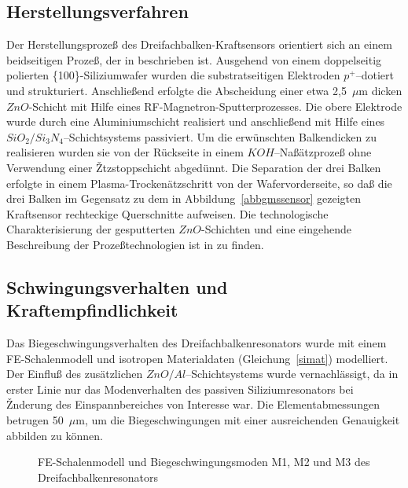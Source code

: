 \subsection{Herstellungsverfahren}
\label{Herstellungsverfahren}

Der Herstellungsprozeß des Dreifachbalken-Kraftsensors orientiert sich an
einem beidseitigen Prozeß, der in \cite{Mul91} beschrieben ist.
Ausgehend von einem doppelseitig polierten \{100\}-Siliziumwafer wurden die
substratseitigen Elektroden $p^{+}$--dotiert und strukturiert.
Anschließend erfolgte die Abscheidung einer etwa 2,5~$\mu$m dicken
$ZnO$-Schicht mit Hilfe eines RF-Magnetron-Sputterprozesses. %
Die obere Elektrode wurde durch eine Aluminiumschicht realisiert und
anschließend mit Hilfe eines $SiO_{2}/Si_{3}N_{4}$--Schichtsystems
passiviert. Um die erwünschten Balkendicken zu realisieren wurden sie von
der Rückseite in einem $KOH$--Naßätzprozeß ohne Verwendung einer
Žtzstoppschicht abgedünnt. Die Separation der drei Balken erfolgte in einem
Plasma-Trockenätzschritt von der Wafervorderseite, so daß die drei Balken
im Gegensatz zu dem in Abbildung~\ref{abbgmssensor} gezeigten Kraftsensor
rechteckige Querschnitte aufweisen. Die technologische
Charakterisierung der gesputterten $ZnO$-Schichten und eine eingehende
Beschreibung der Prozeßtechnologien ist in \cite{Wag94} zu finden.



\subsection{Schwingungsverhalten und Kraftempfindlichkeit}
\label{schwingungsverhaltenundkraftempfindlichkeit}

Das Biegeschwingungsverhalten des Dreifachbalkenresonators wurde mit einem
FE-Schalenmodell und isotropen Materialdaten (Gleichung~\ref{simat})
modelliert. Der
Einfluß des zusätzlichen $ZnO/Al$--Schichtsystems wurde vernachlässigt, da
in erster Linie nur das Modenverhalten des passiven Siliziumresonators
bei Žnderung des Einspannbereiches von Interesse war. Die Elementabmessungen
betrugen 50~$\mu$m, um die Biegeschwingungen mit einer ausreichenden
Genauigkeit abbilden zu können.
\begin{figure}[htb]
\begin{center}

\setabbszw
\end{center}
\caption{\label{abbtbschwing}
  FE-Schalenmodell und Biegeschwingungsmoden M1, M2 und M3
  des Dreifachbalkenresonators}
\end{figure}

